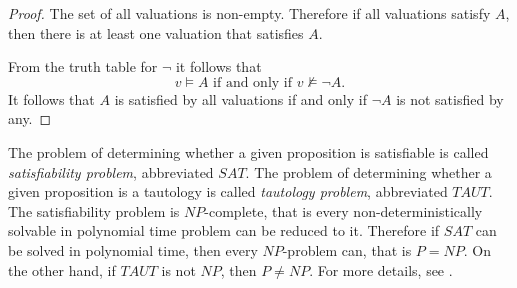 

\setcounter{section}{1}
\setcounter{subsection}{3}
\setcounter{dfn}{6}

\begin{proof}
The set of all valuations is non-empty.
Therefore if all valuations satisfy $A$, then there is at least one valuation that satisfies $A$.

From the truth table for $\neg$ it follows that
\[
v \vDash A \text{ if and only if } v \nvDash \neg A.
\]
It follows that $A$ is satisfied by all valuations if and only if $\neg A$ is not satisfied by any.
\end{proof}

The problem of determining whether a given proposition is satisfiable is called \emph{satisfiability problem}, abbreviated $SAT$.
The problem of determining whether a given proposition is a tautology is called \emph{tautology problem}, abbreviated $TAUT$.
The satisfiability problem is $NP$-complete, that is every non-deterministically solvable in polynomial time problem can be reduced to it.
Therefore if $SAT$ can be solved in polynomial time, then every $NP$-problem can, that is $P=NP$.
On the other hand, if $TAUT$ is not $NP$, then $P \ne NP$.
For more details, see \cite[Section 3.3.5]{Gallier}.


